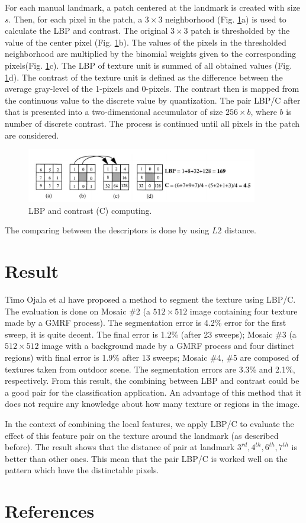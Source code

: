 \documentclass[12pt,a4paper]{article}
\begin{document}
For each manual landmark, a patch centered at the landmark is created  with size $s$. Then, for each pixel in the patch, a $3 \times 3$ neighborhood (Fig. \ref{figlbpc}a) is used to calculate the LBP and contrast. The original $3 \times 3$ patch is thresholded by the value of the center pixel (Fig. \ref{figlbpc}b). The values of the pixels in the thresholded neighborhood are multiplied by the binomial weights given to the corresponding pixels(Fig. \ref{figlbpc}c). The LBP of texture unit is summed of all obtained values (Fig. \ref{figlbpc}d). The contrast of the texture unit is defined as the difference between the average gray-level of the 1-pixels and 0-pixels. The contrast then is mapped from the continuous value to the discrete value by quantization. The pair LBP/C after that is presented into a two-dimensional accumulator of size $256 \times b$, where $b$ is number of discrete contrast. The process is continued until all pixels in the patch are considered.\\
\begin{figure}[htb]
    \centering
    \includegraphics[width=0.9\textwidth]{./images/lbpc}
    \caption{LBP and contrast (C) computing.}
    \label{figlbpc}
\end{figure}
The comparing between the descriptors is done by using $L2$ distance.
\section{Result}
Timo Ojala et al \cite{ojala1999unsupervised} have proposed a method to segment the texture using LBP/C. The evaluation is done on Mosaic \#2 (a $512 \times 512$ image containing four texture made by a GMRF process). The segmentation error is 4.2\% error for the first sweep, it is quite decent. The final error is 1.2\% (after 23 sweeps); Mosaic \#3 (a $512 \times 512$ image with a background made by a GMRF process and four distinct regions) with final error is 1.9\% after 13 sweeps; Mosaic \#4, \#5 are composed of textures taken from outdoor scene. The segmentation errors are 3.3\% and 2.1\%, respectively. From this result, the combining between LBP and contrast could be a good pair for the classification application. An advantage of this method that it does not require any knowledge about how many texture or regions in the image.


In the context of combining the local features, we apply LBP/C to evaluate the effect of this feature pair on the texture around the landmark (as described before). The result shows that the distance of pair at landmark $3^{rd}, 4^{th}, 6^{th}, 7^{th}$ is better than other ones. This mean that the pair LBP/C is worked well on the pattern which have the distinctable pixels.
\section{References}


\end{document}
